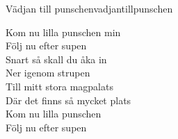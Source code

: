 \begin{song}{Vädjan till punschen}{vadjantillpunschen}
\begin{vers}
Kom nu lilla punschen min\\
Följ nu efter supen\\
Snart så skall du åka in\\
Ner igenom strupen\\
Till mitt stora magpalats\\
Där det finns så mycket plats\\
Kom nu lilla punschen\\
Följ nu efter supen\\
\end{vers}
\end{song}
